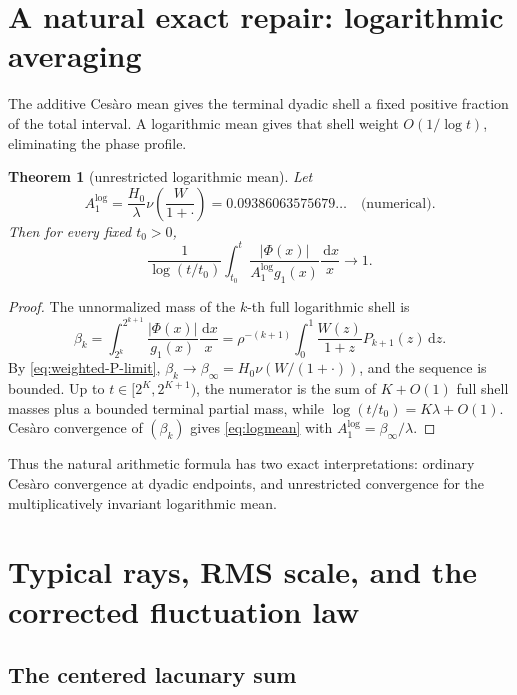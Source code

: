 \documentclass[11pt,oneside]{article}
\newtheorem{theorem}{Theorem}[section]
\theoremstyle{definition}
\theoremstyle{remark}
\newcommand{\dd}{\,\mathrm d}
\begin{document}
\section{A natural exact repair: logarithmic averaging}
\label{sec:logmean}

The additive Ces\`aro mean gives the terminal dyadic shell a fixed positive
fraction of the total interval.  A logarithmic mean gives that shell weight
\(O(1/\log t)\), eliminating the phase profile.

\begin{theorem}[unrestricted logarithmic mean]
\label{thm:logmean}
Let
\begin{equation}
 A_1^{\log}
 =\frac{H_0}{\lambda}\nu\!\left(\frac{W}{1+\cdot}\right)
 =0.09386063575679\ldots\quad\text{(numerical)}.
 \label{eq:Alog}
\end{equation}
Then for every fixed \(t_0>0\),
\begin{equation}
 \boxed{
 \frac1{\log(t/t_0)}\int_{t_0}^t
 \frac{|\Phi(x)|}{A_1^{\log}g_1(x)}\frac{\dd x}{x}
 \longrightarrow1.}
 \label{eq:logmean}
\end{equation}
\end{theorem}

\begin{proof}
The unnormalized mass of the \(k\)-th full logarithmic shell is
\[
 \beta_k
 =\int_{2^k}^{2^{k+1}}\frac{|\Phi(x)|}{g_1(x)}\frac{\dd x}{x}
 =\rho^{-(k+1)}\int_0^1\frac{W(z)}{1+z}P_{k+1}(z)\dd z.
\]
By \eqref{eq:weighted-P-limit},
\(\beta_k\to\beta_\infty=H_0\nu(W/(1+\cdot))\), and the sequence is
bounded.  Up to \(t\in[2^K,2^{K+1})\), the numerator is the sum of
\(K+O(1)\) full shell masses plus a bounded terminal partial mass, while
\(\log(t/t_0)=K\lambda+O(1)\).  Ces\`aro convergence of \((\beta_k)\) gives
\eqref{eq:logmean} with \(A_1^{\log}=\beta_\infty/\lambda\).
\end{proof}

Thus the natural arithmetic formula has two exact interpretations: ordinary
Ces\`aro convergence at dyadic endpoints, and unrestricted convergence for the
multiplicatively invariant logarithmic mean.

\section{Typical rays, RMS scale, and the corrected fluctuation law}
\label{sec:typical}

\subsection{The centered lacunary sum}
\end{document}
